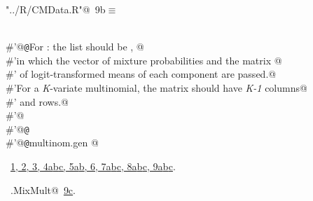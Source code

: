 \documentclass[reqno]{amsart}
\renewcommand{\NWtarget}[2]{\hypertarget{#1}{#2}}
\renewcommand{\NWlink}[2]{\hyperlink{#1}{#2}}
\begin{document}
\begin{flushleft} \small\label{scrap17}\raggedright\small
\NWtarget{nuweb9b}{} \verb@"../R/CMData.R"@\nobreak\ {\footnotesize {9b}}$\equiv$
\vspace{-1ex}
\begin{list}{}{} \item
\mbox{}\verb@@\\
\mbox{}\verb@#'@{\tt @}\verb@details For : the  list should be , @\\
\mbox{}\verb@#'in which the vector of mixture probabilities  and the matrix @\\
\mbox{}\verb@#' of logit-transformed means of each component are passed.@\\
\mbox{}\verb@#'For a \emph{K}-variate multinomial, the matrix  should have \emph{K-1} columns@\\
\mbox{}\verb@#' and  rows.@\\
\mbox{}\verb@#'@\\
\mbox{}\verb@#'@{\tt @}\verb@export@\\
\mbox{}\verb@#'@{\tt @}\verb@rdname multinom.gen @\\
\mbox{}\verb@@{\NWsep}
\end{list}
\vspace{-1.5ex}
\footnotesize
\begin{list}{}{\setlength{\itemsep}{-\parsep}\setlength{\itemindent}{-\leftmargin}}
\item \NWtxtFileDefBy\ \NWlink{nuweb1}{1}\NWlink{nuweb2}{, 2}\NWlink{nuweb3}{, 3}\NWlink{nuweb4a}{, 4a}\NWlink{nuweb4b}{b}\NWlink{nuweb4c}{c}\NWlink{nuweb5a}{, 5a}\NWlink{nuweb5b}{b}\NWlink{nuweb6}{, 6}\NWlink{nuweb7a}{, 7a}\NWlink{nuweb7b}{b}\NWlink{nuweb7c}{c}\NWlink{nuweb8a}{, 8a}\NWlink{nuweb8b}{b}\NWlink{nuweb8c}{c}\NWlink{nuweb9a}{, 9a}\NWlink{nuweb9b}{b}\NWlink{nuweb9c}{c}.
\item \NWtxtIdentsUsed\nobreak\  \verb@mg.MixMult@\nobreak\ \NWlink{nuweb9c}{9c}.
\item{}
\end{list}
\vspace{4ex}
\end{flushleft}
\end{document}
